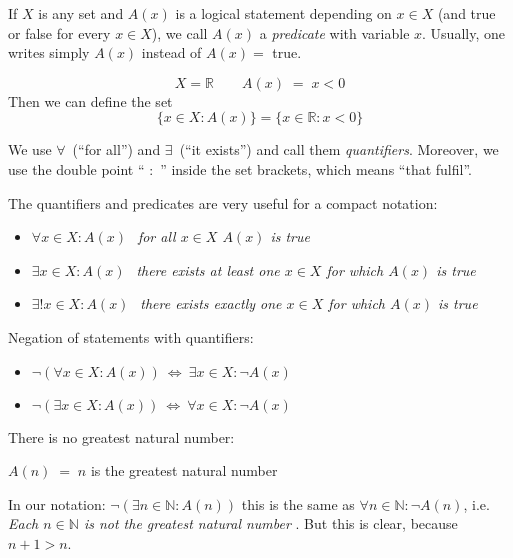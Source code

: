 

\begin{Definition}[Predicate]
If $X$ is any set and $A(x)$ is a logical statement depending on $x \in X$ (and true or false for every $x\in X$),
we call $A(x)$ a \emph{predicate} with variable $x$.
Usually, one writes simply $A(x)$ instead of $A(x)=$ true. 
\end{Definition}

\begin{example}{}
\[
 X=\mathbb{R}\qquad   A(x) \;=\; x < 0
\]
Then we can define the set
	$$
	\{ x \in X : A(x) \}	= \{ x \in \mathbb{R} : x < 0 \}
	$$
\end{example}

\begin{Definition}
We use
$\forall$~(``for all'') and $\exists$~(``it exists'')
and call them \emph{quantifiers}.
Moreover, we use
the double point `` $:$ '' inside the set brackets, which means
``that fulfil''.  
\end{Definition}


The quantifiers and predicates are very useful for a compact notation:
\begin{itemize}
 \item $\forall x \in X : A(x)~~$  \emph{for all $x\in X$ $A(x)$ is true}
 \item $\exists x \in X : A(x)~~$  \emph{there exists at least one $x\in X$ for which $A(x)$ is true}
 \item $\exists! x \in X : A(x)~~$ \emph{there exists exactly one $x\in X$ for which $A(x)$ is true}
\end{itemize}

Negation of statements with quantifiers:
\begin{itemize}
 \item $\neg (\forall x \in X : A(x)) ~\Leftrightarrow~ \exists x \in X : \neg A(x)$
 \item $\neg (\exists x \in X : A(x)) ~\Leftrightarrow~ \forall x \in X : \neg A(x)$
\end{itemize}

\begin{example}
There is no greatest natural number:
\begin{center}
 $A(n) \;=\; n$ is the greatest natural  number
\end{center}
In our notation: $\neg (\exists n \in \mathbb{N} : A(n))$ this is the same as $\forall n \in \mathbb{N} : \neg A(n)$,
i.e. \emph{Each $n \in \mathbb{N}$ is not the greatest natural number }.
But this is clear, because $n+1 > n$. 
\end{example}

